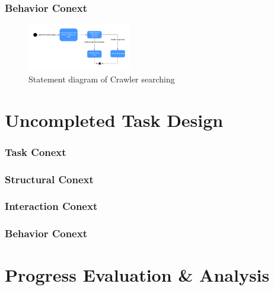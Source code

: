 \documentclass[conference]{IEEEtran}
\begin{document}
\subsubsection{\textbf{Behavior Conext }}

\begin{figure}[htbp]
	\centerline{\includegraphics[width=0.4\textwidth]{image/crawler searching statement1.pdf}}
	\caption{Statement diagram of Crawler searching }
	\label{statement1}
\end{figure}


\section{\textbf{Uncompleted Task Design }}


\subsubsection{\textbf{Task Conext }}


\subsubsection{\textbf{Structural Conext }}


\subsubsection{\textbf{Interaction Conext }}


\subsubsection{\textbf{Behavior Conext }}



\section{\textbf{Progress Evaluation \& Analysis }}
\end{document}
